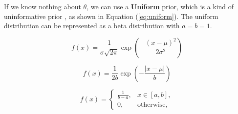 \documentclass[ %
                    author={Revalda Putawara},
                supervisor={Dr. James Pope},
                    degree={MSc},
                     title={Robustness of Bayesian Neural Networks Design Choices Against Weight and Bias Perturbation Induced by Single Event Upsets (SEUs)},
                      type={},
                      year={2025}]{dissertation}
\begin{document}





If we know nothing about $\theta$, we can use a \textbf{Uniform} prior, which is a kind of uninformative prior \cite{murphy2012}, as shown in Equation (\ref{eq:uniform}). The uniform distribution can be represented as a beta distribution with $a = b = 1$. 



\noindent
\begin{minipage}{0.32\linewidth}
\begin{equation}
f(x) = \frac{1}{\sigma\sqrt{2\pi}} 
       \exp\!\left(-\frac{(x-\mu)^2}{2\sigma^2}\right)
\label{eq:gaussian}
\end{equation}
\end{minipage}\hfill
\begin{minipage}{0.32\linewidth}
\begin{equation}
f(x) = \frac{1}{2b} 
       \exp\!\left(-\frac{|x-\mu|}{b}\right)
\label{eq:laplace}
\end{equation}
\end{minipage}\hfill
\begin{minipage}{0.32\linewidth}
\begin{equation}
f(x) =
\begin{cases}
 \tfrac{1}{b-a}, & x \in [a,b], \\
 0, & \text{otherwise},
\end{cases}
\label{eq:uniform}
\end{equation}
\end{minipage}
\end{document}
